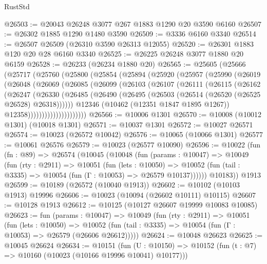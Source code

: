 \begin{lexlean}{RustStd}
\begin{coremodule}
@26503 := @20043 @26248 @3077 @267 @1883 @1290 @20 @3590 @6160
@26507 := @26302 @1885 @1290 @1480 @3590
@26509 := @3336 @6160 @3340
@26514 := @26507 @26509 (@26310 @3590 @26313 @12055)
@26520 := @26301 @1883 @120 @20 @28 @6160 @3340
@26525 := @26225 @26248 @3077 @1880 @20 @6159
@26528 := @26233 (@26234 @1880 @20)
@26565 := @25605
    (@25666
      (@25717
        (@25760
          (@25800
            (@25854
              (@25894
                (@25920
                  (@25957
                    (@25990
                      (@26019
                        (@26048
                          (@26069
                            (@26085
                              (@26099
                                (@26103
                                  (@26107
                                    (@26111
                                      (@26115
                                        (@26162
                                          (@26247
                                            (@26330
                                              (@26485
                                                (@26490
                                                  (@26495
                                                    (@26503
                                                      (@26514 (@26520 (@26525 @26528) @26318))))))
                                              @12346
                                              (@10462 (@12351 @1847 @1895 @1267))
                                              @12358)))))))))))))))))))))
@26566 := @10006 @1301
@26570 := @10008 (@10012 @1301) (@10018 @1301)
@26571 := @10037 @1301
@26572 := @10027 @26571
@26574 := @10023 (@26572 @10042)
@26576 := @10065 (@10066 @1301)
@26577 := @10061 @26576
@26579 := @10023 (@26577 @10090)
@26596 := @10022
    (fun (fn : @89) =>
    @26574
      (@10045
        (@10048
          (fun (params : @10047) =>
          @10049
            (fun (rty : @2911) =>
            @10051
              (fun (lets : @10050) =>
              @10052 (fun (tail : @3335) => @10054 (fun (Γ : @10053) => @26579 @10137))))))
        @10183))
    @1913
@26599 := @10189 (@26572 (@10040 @1913))
@26602 := @10102 (@10103 @1913) @19996
@26606 := @10023 (@10094 (@26602 @10111) @10115)
@26607 := @10128 @1913
@26612 := @10125 (@10127 @26607 @19999 @10083 @10085)
@26623 := fun (params : @10047) =>
  @10049
    (fun (rty : @2911) =>
    @10051
      (fun (lets : @10050) =>
      @10052 (fun (tail : @3335) => @10054 (fun (Γ : @10053) => @26579 (@26606 @26612)))))
@26624 := @10048 @26623
@26625 := @10045 @26624
@26634 := @10151
    (fun (U : @10150) => @10152 (fun (t : @7) => @10160 (@10023 (@10166 @19996 @10041) @10177)))

\end{coremodule}
\end{lexlean}
